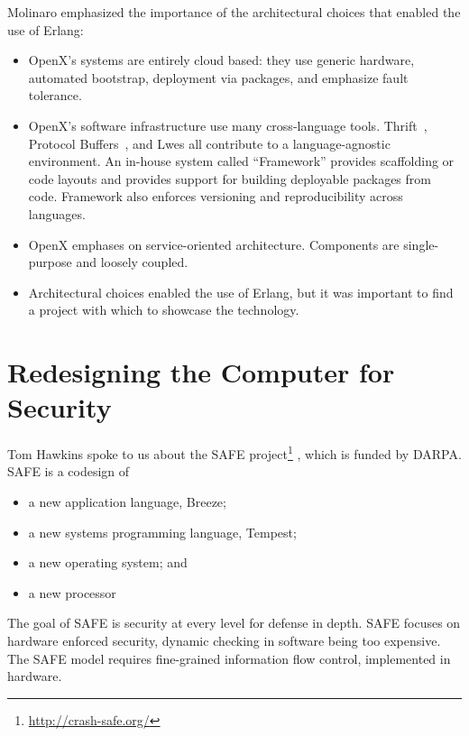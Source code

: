 \documentclass{jfp1}
\begin{document}
Molinaro emphasized the importance of the architectural choices that
enabled the use of Erlang:

\begin{itemize}

\item OpenX's systems are entirely cloud based: they use generic hardware,
automated bootstrap, deployment via packages, and emphasize fault
tolerance.

\item OpenX's software infrastructure use many cross-language tools. Thrift~\cite{Slee:Thrift},
Protocol Buffers~\cite{Google:2014:Protobufs}, and Lwes all
contribute to a language-agnostic environment. An in-house system
called ``Framework'' provides scaffolding or code layouts and provides
support for building deployable packages from code. Framework also
enforces versioning and reproducibility across languages.

\item OpenX emphases on service-oriented architecture. Components are
single-purpose and loosely coupled.

\item Architectural choices enabled the use
of Erlang, but it was important to find a project with which to
showcase the technology.

\end{itemize}

\section{Redesigning the Computer for Security}


Tom Hawkins spoke to us about the SAFE
project\footnote{\url{http://crash-safe.org/}} , which is funded by
DARPA. SAFE is a codesign of

\begin{itemize}
\item a new application language, Breeze;
\item a new systems programming language, Tempest;
\item a new operating system; and
\item a new processor 
\end{itemize}

The goal of SAFE is security at every level for defense in depth.
SAFE focuses on hardware enforced security, dynamic checking
in software being too expensive. The SAFE model requires fine-grained
information flow control, implemented in hardware.
\end{document}

